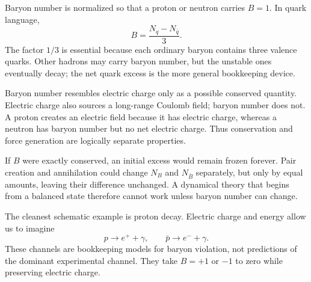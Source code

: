 Baryon number is normalized so that a proton or neutron carries \(B=1\). In quark language,
\begin{equation}
B=\frac{N_q-N_{\bar q}}{3}.
\label{eq:c08-baryon-number}
\end{equation}
The factor \(1/3\) is essential because each ordinary baryon contains three valence quarks. Other hadrons may carry baryon number, but the unstable ones eventually decay; the net quark excess is the more general bookkeeping device.

\begin{classroomqa}
\end{classroomqa}

Baryon number resembles electric charge only as a possible conserved quantity. Electric charge also sources a long-range Coulomb field; baryon number does not. A proton creates an electric field because it has electric charge, whereas a neutron has baryon number but no net electric charge. Thus conservation and force generation are logically separate properties.

\begin{classroomqa}
\end{classroomqa}

If \(B\) were exactly conserved, an initial excess would remain frozen forever. Pair creation and annihilation could change \(N_B\) and \(N_{\bar B}\) separately, but only by equal amounts, leaving their difference unchanged. A dynamical theory that begins from a balanced state therefore cannot work unless baryon number can change.

The cleanest schematic example is proton decay. Electric charge and energy allow us to imagine
\begin{equation}
p\longrightarrow e^+ +\gamma,
\qquad
\bar p\longrightarrow e^-+\gamma.
\label{eq:c08-decay-pair}
\end{equation}
These channels are bookkeeping models for baryon violation, not predictions of the dominant experimental channel. They take \(B=+1\) or \(-1\) to zero while preserving electric charge.

